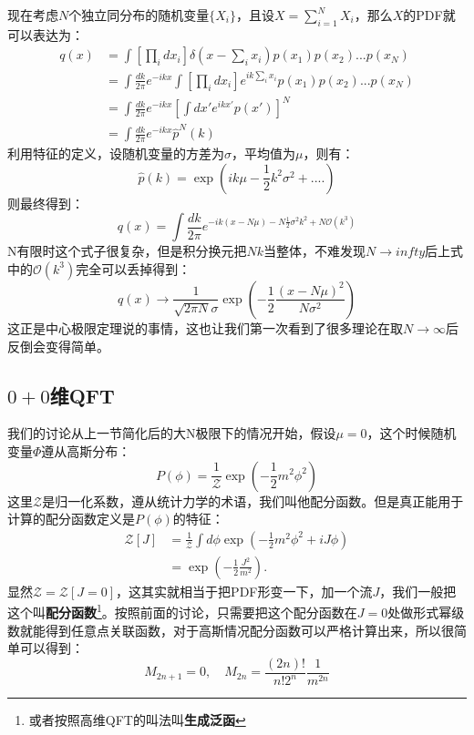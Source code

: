 现在考虑$N$个独立同分布的随机变量$\{X_i\}$，且设$X=\sum_{i=1}^N X_i$，那么$X$的PDF就可以表达为：
\begin{equation}
	\begin{aligned}
		q(x)&=\int[\prod_idx_i]\delta(x-\sum_ix_i)p(x_1)p(x_2)...p(x_N)\\
		&=\int\frac{dk}{2\pi}e^{-ikx}\int[\prod_idx_i]e^{ik\sum_ix_i}p(x_1)p(x_2)...p(x_N) \\
		&=\int\frac{dk}{2\pi}e^{-ikx}[\int dx'e^{ikx'}p(x')]^N \\
		&=\int\frac{dk}{2\pi}e^{-ikx}\widehat{p}^N(k)
	\end{aligned}
\end{equation}
利用特征的定义，设随机变量的方差为$\sigma$，平均值为$\mu$，则有：
\begin{equation}
	\widehat{p}(k)=\exp\left(ik\mu-\frac12k^2\sigma^2+....\right)
\end{equation}
则最终得到：
\begin{equation}
	q(x)=\int\frac{dk}{2\pi}e^{-ik(x-N\mu)-N\frac12\sigma^2k^2+N\mathcal{O}(k^3)}
\end{equation}
N有限时这个式子很复杂，但是积分换元把$Nk$当整体，不难发现$N\to infty$后上式中的$\mathcal{O}(k^3)$完全可以丢掉得到：
\begin{equation}
	q(x)\to\frac1{\sqrt{2\pi N}\sigma}\operatorname{exp}(-\frac12\frac{(x-N\mu)^2}{N\sigma^2})
\end{equation}
这正是中心极限定理说的事情，这也让我们第一次看到了很多理论在取$N\to\infty$后反倒会变得简单。

\subsection{$0+0$维QFT}
我们的讨论从上一节简化后的大N极限下的情况开始，假设$\mu=0$，这个时候随机变量$\Phi$遵从高斯分布：
\begin{equation}
	P(\phi)=\frac1{\mathcal{Z}}\operatorname{exp}(-\frac12m^2\phi^2)
\end{equation}
这里$\mathcal{Z}$是归一化系数，遵从统计力学的术语，我们叫他配分函数。但是真正能用于计算的配分函数定义是$P(\phi)$的特征：
\begin{equation}
	\begin{aligned}\mathcal{Z}[J]&=\frac{1}{\mathcal{Z}}\int d\phi\exp(-\frac{1}{2}m^2\phi^2+iJ\phi)\\&=\exp(-\frac{1}{2}\frac{J^2}{m^2}).\end{aligned}
\end{equation}
显然$\mathcal{Z}=\mathcal{Z}[J=0]$，这其实就相当于把PDF形变一下，加一个流$J$，我们一般把这个叫\textbf{配分函数}\footnote{或者按照高维QFT的叫法叫\textbf{生成泛函}}。按照前面的讨论，只需要把这个配分函数在$J=0$处做形式幂级数就能得到任意点关联函数，对于高斯情况配分函数可以严格计算出来，所以很简单可以得到：
\begin{equation}
	M_{2n+1}=0,\quad M_{2n}=\frac{(2n)!}{n!2^n}\frac1{m^{2n}}
\end{equation}

